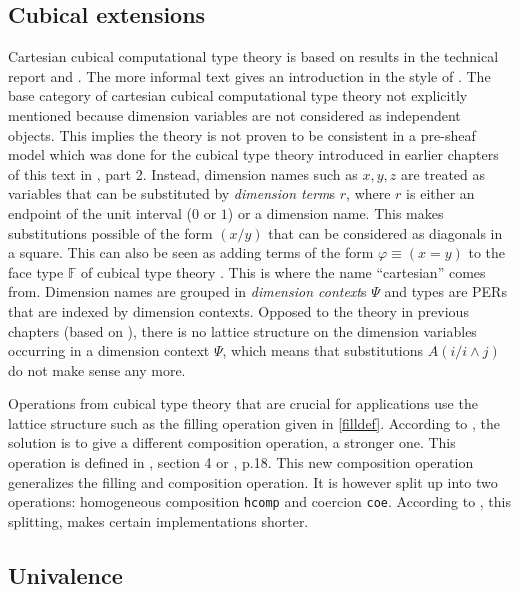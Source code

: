 \documentclass[12pt,a4paper,twoside,xetex]{book} %
\newcommand{\keyword}[1]{\emph{#1}\index{#1}}
\begin{document}
\subsection{Cubical extensions}

Cartesian cubical computational type theory is based on results in the technical 
report \cite{AnHoHa17} and \cite{Angiuli2018}. The more informal text 
\cite{Bentzen2018Jun} gives an introduction in the style of 
\cite{Voevodsky2013}. The base category of cartesian cubical computational type 
theory not explicitly mentioned because dimension variables are not considered 
as independent objects. This implies the theory is not proven to be consistent 
in a pre-sheaf model which was done for the cubical type theory introduced in 
earlier chapters of this text in \cite{Huber2016}, part 2. Instead, dimension 
names such as $x,y,z$ are treated as variables that can be substituted 
by \keyword{dimension term}s $r$, where $r$ is either an endpoint of the unit 
interval ($0$ or $1$) or a dimension name. This makes substitutions possible of 
the form $(x/y)$ that can be considered as diagonals in a square. This can also 
be seen as adding terms of the form $\varphi \equiv (x = y)$ to the face type 
$\mathbb{F}$ of cubical type theory \cite{Huber2016}. This is where the name 
``cartesian'' comes from. Dimension names are grouped in \keyword{dimension 
context}s $\Psi$ and types are PERs that are indexed by dimension contexts. 
Opposed to the theory in previous chapters (based on \cite{Huber2016}), there is 
no lattice structure on the dimension variables occurring in a dimension context 
$\Psi$, which means that substitutions  $A(i/i\wedge j)$ do not make sense 
any more.

Operations from cubical type theory that are crucial for applications use the 
lattice structure such as the filling operation given in \cref{filldef}. 
According to \cite{Moertberg2018Bonn}, the solution is to give a different 
composition operation, a stronger one. This operation is defined in 
\cite{Angiuli2018}, section 4 or \cite{Moertberg2018Bonn}, p.18. This new 
composition operation generalizes the filling and composition operation. It is 
however split up into two operations: homogeneous composition \texttt{hcomp} and 
coercion \texttt{coe}. According to \cite{Moertberg2018Bonn}, this splitting, 
makes certain implementations shorter.

\subsection{Univalence}\label{compuniv}
\end{document}
